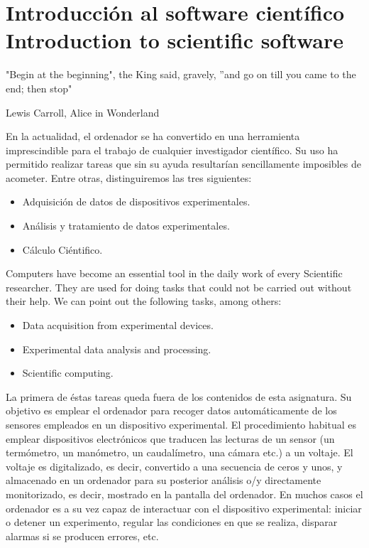 \chapter[Intro al sw Científico. \textsection \textsection \ Intro to scientific sw.]{Introducción al software científico\\ Introduction to scientific software}
\epigraph{"Begin at the beginning", the King said, gravely, ''and go on till you came to the end; then stop"}{Lewis Carroll, Alice in Wonderland}
\begin{paracol}{2}
En la actualidad, el ordenador se ha convertido en una herramienta imprescindible para el trabajo de cualquier investigador científico. Su uso ha permitido realizar tareas que sin su ayuda resultarían sencillamente imposibles de acometer. Entre otras, distinguiremos las tres siguientes:
\begin{itemize}
\item Adquisición de datos de dispositivos experimentales.
\item Análisis y tratamiento de datos experimentales. 
\item Cálculo Ciéntifico.
\end{itemize}
\switchcolumn
Computers have become an essential tool in the daily work of every Scientific researcher. They are used for doing tasks that could not be carried out without their help. We can point out the following tasks, among others:
 \begin{itemize}
\item Data acquisition from experimental devices.
\item Experimental data analysis and processing. 
\item Scientific computing.
\end{itemize}     


\switchcolumn
La primera de éstas tareas queda fuera de los contenidos de esta asignatura. Su objetivo es emplear el ordenador para recoger datos automáticamente de los sensores empleados en un dispositivo experimental. El procedimiento habitual es emplear dispositivos electrónicos que traducen las lecturas de un sensor (un termómetro, un manómetro, un caudalímetro, una cámara etc.) a un voltaje. El voltaje es digitalizado, es decir, convertido a una secuencia de ceros y unos, y almacenado en un ordenador para su posterior análisis o/y directamente monitorizado, es decir, mostrado en la pantalla del ordenador. En muchos casos el ordenador es a su vez capaz de interactuar con el dispositivo experimental: iniciar o detener un experimento, regular las condiciones en que se realiza, disparar alarmas si se producen errores, etc.


\end{paracol}
